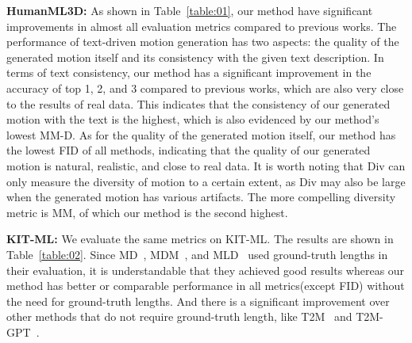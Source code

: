 \documentclass[10pt,twocolumn,letterpaper]{article}
\begin{document}
\textbf{HumanML3D:} As shown in Table~\ref{table:01}, our method have significant improvements in almost all evaluation metrics compared to previous works. The performance of text-driven motion generation has two aspects: the quality of the generated motion itself and its consistency with the given text description. In terms of text consistency, our method has a significant improvement in the accuracy of top 1, 2, and 3 compared to previous works, which are also very close to the results of real data. This indicates that the consistency of our generated motion with the text is the highest, which is also evidenced by our method's lowest MM-D. As for the quality of the generated motion itself, our method has the lowest FID of all methods, indicating that the quality of our generated motion is natural, realistic, and close to real data. It is worth noting that Div can only measure the diversity of motion to a certain extent, as Div may also be large when the generated motion has various artifacts. The more compelling diversity metric is MM, of which our method is the second highest.





\textbf{KIT-ML:}
We evaluate the same metrics on KIT-ML. The results are shown in Table~\ref{table:02}. Since MD~\cite{zhang2022motiondiffuse}, MDM~\cite{tevet2023human}, and MLD~\cite{chen2023mld} used ground-truth lengths in their evaluation, it is understandable that they achieved good results whereas our method has better or comparable performance in all metrics(except FID) without the need for ground-truth lengths. And there is a significant improvement over other methods that do not require ground-truth length, like T2M~\cite{guo2022generating} and T2M-GPT~\cite{zhang2023t2m}.
\end{document}
